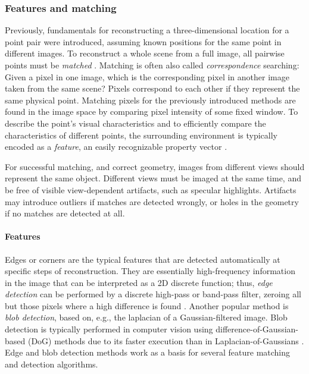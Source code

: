 
\subsubsection{Features and matching} %

Previously, fundamentals for reconstructing a three-dimensional location for a point pair were introduced, assuming known positions for the same point in different images.
To reconstruct a whole scene from a full image, all pairwise points must be \emph{matched} \cite[ch.~4]{szeliski10vision}.
Matching is often also called \emph{correspondence} searching:
Given a pixel in one image, which is the corresponding pixel in another image taken from the same scene?
Pixels correspond to each other if they represent the same physical point.
Matching pixels for the previously introduced methods are found in the image space by comparing pixel intensity of some fixed window.
To describe the point's visual characteristics and to efficiently compare the characteristics of different points, the surrounding environment is typically encoded as a \emph{feature}, an easily recognizable property vector \cite[ch.~4]{szeliski10vision}.

For successful matching, and correct geometry, images from different views should represent the same object.
Different views must be imaged at the same time, and be free of visible view-dependent artifacts, such as specular highlights.
Artifacts may introduce outliers if matches are detected wrongly, or holes in the geometry if no matches are detected at all.

\paragraph{Features}
Edges or corners are the typical features that are detected automatically at specific steps of reconstruction.
They are essentially high-frequency information in the image that can be interpreted as a 2D discrete function;
thus, \emph{edge detection} can be performed by a discrete high-pass or band-pass filter, zeroing all but those pixels where a high difference is found \cite{marr1980theory}.
Another popular method is \emph{blob detection}, based on, e.g., the laplacian of a Gaussian-filtered image.
Blob detection is typically performed in computer vision using difference-of-Gaussian-based (DoG) methods due to its faster execution than in Laplacian-of-Gaussians \cite[p.~152]{szeliski10vision}.
Edge and blob detection methods work as a basis for several feature matching and detection algorithms.

